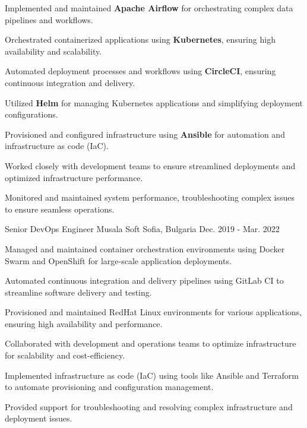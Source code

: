 \begin{cventries}
{\begin{cvitems}
        \item {Implemented and maintained \textbf{Apache Airflow} for orchestrating complex data pipelines and workflows.}
        \item {Orchestrated containerized applications using \textbf{Kubernetes}, ensuring high availability and scalability.}
        \item {Automated deployment processes and workflows using \textbf{CircleCI}, ensuring continuous integration and delivery.}
        \item {Utilized \textbf{Helm} for managing Kubernetes applications and simplifying deployment configurations.}
        \item {Provisioned and configured infrastructure using \textbf{Ansible} for automation and infrastructure as code (IaC).}
        \item {Worked closely with development teams to ensure streamlined deployments and optimized infrastructure performance.}
        \item {Monitored and maintained system performance, troubleshooting complex issues to ensure seamless operations.}
      \end{cvitems}
    }
  \cventry
    {Senior DevOps Engineer} %
    {Musala Soft} %
    {Sofia, Bulgaria} %
    {Dec. 2019 - Mar. 2022} %
    {
      \begin{cvitems} %
        \item {Managed and maintained container orchestration environments using Docker Swarm and OpenShift for large-scale application deployments.}
        \item {Automated continuous integration and delivery pipelines using GitLab CI to streamline software delivery and testing.}
        \item {Provisioned and maintained RedHat Linux environments for various applications, ensuring high availability and performance.}
        \item {Collaborated with development and operations teams to optimize infrastructure for scalability and cost-efficiency.}
        \item {Implemented infrastructure as code (IaC) using tools like Ansible and Terraform to automate provisioning and configuration management.}
        \item {Provided support for troubleshooting and resolving complex infrastructure and deployment issues.}

\end{cvitems}}
\end{cventries}
